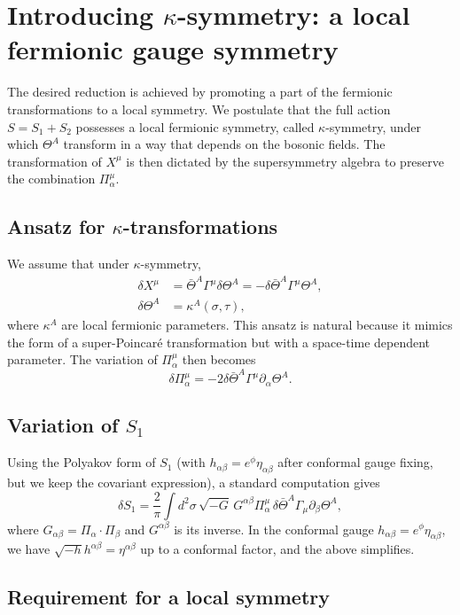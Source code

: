 \documentclass[12pt]{article}
\begin{document}
\section{Introducing $\kappa$-symmetry: a local fermionic gauge symmetry}

The desired reduction is achieved by promoting a part of the fermionic transformations to a local symmetry. We postulate that the full action $S = S_1 + S_2$ possesses a local fermionic symmetry, called $\kappa$-symmetry, under which $\Theta^A$ transform in a way that depends on the bosonic fields. The transformation of $X^\mu$ is then dictated by the supersymmetry algebra to preserve the combination $\Pi^\mu_\alpha$.

\subsection{Ansatz for $\kappa$-transformations}

We assume that under $\kappa$-symmetry,
\begin{align}
\delta X^\mu &= \bar{\Theta}^A\Gamma^\mu\delta\Theta^A = -\delta\bar{\Theta}^A\Gamma^\mu\Theta^A, \label{kappa:x}\\
\delta\Theta^A &= \kappa^A(\sigma,\tau),
\end{align}
where $\kappa^A$ are local fermionic parameters. This ansatz is natural because it mimics the form of a super-Poincar\'e transformation but with a space-time dependent parameter. The variation of $\Pi^\mu_\alpha$ then becomes
\[
\delta\Pi^\mu_\alpha = -2\delta\bar{\Theta}^A\Gamma^\mu\partial_\alpha\Theta^A.
\]

\subsection{Variation of $S_1$}

Using the Polyakov form of $S_1$ (with $h_{\alpha\beta}=e^\phi\eta_{\alpha\beta}$ after conformal gauge fixing, but we keep the covariant expression), a standard computation gives
\[
\delta S_1 = \frac{2}{\pi}\int d^2\sigma\,\sqrt{-G}\,G^{\alpha\beta}\Pi^\mu_\alpha\,\delta\bar{\Theta}^A\Gamma_\mu\partial_\beta\Theta^A,
\]
where $G_{\alpha\beta}=\Pi_\alpha\cdot\Pi_\beta$ and $G^{\alpha\beta}$ is its inverse. In the conformal gauge $h_{\alpha\beta}=e^\phi\eta_{\alpha\beta}$, we have $\sqrt{-h}h^{\alpha\beta}= \eta^{\alpha\beta}$ up to a conformal factor, and the above simplifies.

\subsection{Requirement for a local symmetry}
\end{document}
